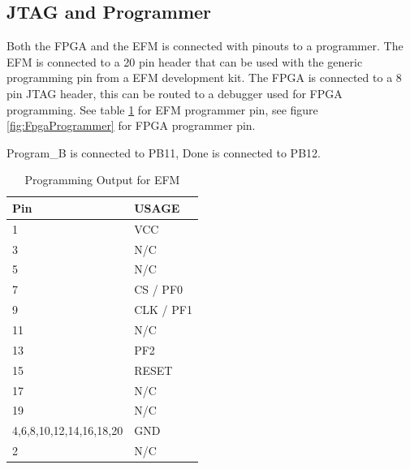 \subsection{JTAG and Programmer}
Both the FPGA and the EFM is connected with pinouts to a programmer.
The EFM is connected to a 20 pin header that can be used with the generic programming pin from a EFM development kit.
The FPGA is connected to a 8 pin JTAG header, this can be routed to a debugger used for FPGA programming.
See table \ref{tab:EfmProgrammer} for EFM programmer pin, see figure \ref{fig:FpgaProgrammer} for FPGA programmer pin.

Program\_B is connected to PB11, Done is connected to PB12.
\begin{table}[]
    \centering
    \begin{tabular}{ll}
        Pin                     & USAGE     \\
        \hline
        1                       & VCC       \\
        3                       & N/C       \\
        5                       & N/C       \\
        7                       & CS / PF0  \\
        9                       & CLK / PF1 \\
        11                      & N/C       \\
        13                      & PF2       \\
        15                      & RESET     \\
        17                      & N/C       \\
        19                      & N/C       \\
        4,6,8,10,12,14,16,18,20 & GND       \\
        2                       & N/C
    \end{tabular}
    \caption{Programming Output for EFM}
    \label{tab:EfmProgrammer}
\end{table}

